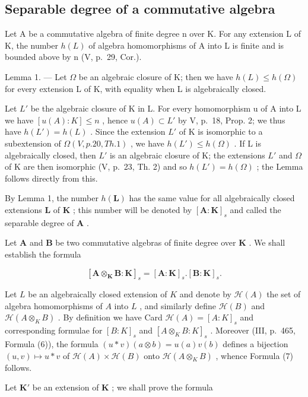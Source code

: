 \subsection{Separable degree of a commutative algebra}

Let A be a commutative algebra of finite degree n over K. For any extension L of K, the number \(h(L)\) of algebra homomorphisms of A into L is finite and is bounded above by n (V, p.~29, Cor.).

Lemma 1. --- Let \(\Omega\) be an algebraic closure of K; then we have \(h(L) \leqslant h(\Omega)\) for every extension L of K, with equality when L is algebraically closed.

Let \(L'\) be the algebraic closure of K in L. For every homomorphism u of A into L we have \([u(A):K] \leqslant n\) , hence \(u(A) \subset L'\) by V, p.~18, Prop. 2; we thus have \(h(L') = h(L)\) . Since the extension \(L'\) of K is isomorphic to a subextension of \(\Omega(V, p. 20, Th. 1)\) , we have \(h(L') \leqslant h(\Omega)\) . If L is algebraically closed, then \(L'\) is an algebraic closure of K; the extensions \(L'\) and \(\Omega\) of K are then isomorphic (V, p.~23, Th. 2) and so \(h(L') = h(\Omega)\) ; the Lemma follows directly from this.

By Lemma 1, the number \(h(\mathbf{L})\) has the same value for all algebraically closed extensions \(\mathbf{L}\) of \(\mathbf{K}\) ; this number will be denoted by \([\mathbf{A}:\mathbf{K}]_s\) and called the separable degree of \(\mathbf{A}\) .

Let \(\mathbf{A}\) and \(\mathbf{B}\) be two commutative algebras of finite degree over \(\mathbf{K}\) . We shall establish the formula

\[
[ \mathbf {A} \otimes_ {\mathbf {K}} \mathbf {B}: \mathbf {K} ] _ {s} = [ \mathbf {A}: \mathbf {K} ] _ {s}. [ \mathbf {B}: \mathbf {K} ] _ {s}.\tag{7}
\]

Let \(L\) be an algebraically closed extension of \(K\) and denote by \(\mathcal{H}(A)\) the set of algebra homomorphisms of \(A\) into \(L\) , and similarly define \(\mathcal{H}(B)\) and \(\mathcal{H}(A \otimes_K B)\) . By definition we have Card \(\mathcal{H}(A) = [A : K]_s\) and corresponding formulae for \([B:K]_{s}\) and \([A\otimes_{K}B:K]_{s}\) . Moreover (III, p.~465, Formula (6)), the formula \((u*v)(a\otimes b)=u(a)v(b)\) defines a bijection \((u,v)\mapsto u*v\) of \(\mathcal{H}(A)\times\mathcal{H}(B)\) onto \(\mathcal{H}(A\otimes_{K}B)\) , whence Formula (7) follows.

Let \(\mathbf{K}'\) be an extension of \(\mathbf{K}\) ; we shall prove the formula

